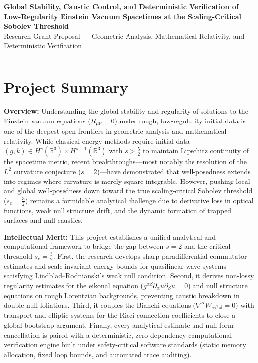 \documentclass[11pt, a4paper]{article}
\begin{document}
\begin{center}
    {\Large \bfseries \color{accentblue} Global Stability, Caustic Control, and Deterministic Verification of Low-Regularity Einstein Vacuum Spacetimes at the Scaling-Critical Sobolev Threshold} \\[0.6em]
    {\small \color{subgray} Research Grant Proposal --- Geometric Analysis, Mathematical Relativity, and Deterministic Verification}
\end{center}

\vspace{0.5em}
\hrule
\vspace{1.0em}

\section*{Project Summary}

\noindent \textbf{Overview:} Understanding the global stability and regularity of solutions to the Einstein vacuum equations ($R_{\mu\nu} = 0$) under rough, low-regularity initial data is one of the deepest open frontiers in geometric analysis and mathematical relativity. While classical energy methods require initial data $(\bar{g}, k) \in H^s(\mathbb{R}^3) \times H^{s-1}(\mathbb{R}^3)$ with $s > \frac{5}{2}$ to maintain Lipschitz continuity of the spacetime metric, recent breakthroughs---most notably the resolution of the $L^2$ curvature conjecture ($s = 2$)---have demonstrated that well-posedness extends into regimes where curvature is merely square-integrable. However, pushing local and global well-posedness down toward the true scaling-critical Sobolev threshold ($s_c = \frac{3}{2}$) remains a formidable analytical challenge due to derivative loss in optical functions, weak null structure drift, and the dynamic formation of trapped surfaces and null caustics.

\vspace{0.4em}
\noindent \textbf{Intellectual Merit:} This project establishes a unified analytical and computational framework to bridge the gap between $s = 2$ and the critical threshold $s_c = \frac{3}{2}$. First, the research develops sharp paradifferential commutator estimates and scale-invariant energy bounds for quasilinear wave systems satisfying Lindblad--Rodnianski's weak null condition. Second, it derives non-lossy regularity estimates for the eikonal equation ($g^{\alpha\beta}\partial_\alpha u \partial_\beta u = 0$) and null structure equations on rough Lorentzian backgrounds, preventing caustic breakdown in double null foliations. Third, it couples the Bianchi equations ($\nabla^\alpha W_{\alpha\beta\gamma\delta} = 0$) with transport and elliptic systems for the Ricci connection coefficients to close a global bootstrap argument. Finally, every analytical estimate and null-form cancellation is paired with a deterministic, zero-dependency computational verification engine built under safety-critical software standards (static memory allocation, fixed loop bounds, and automated trace auditing).
\end{document}
